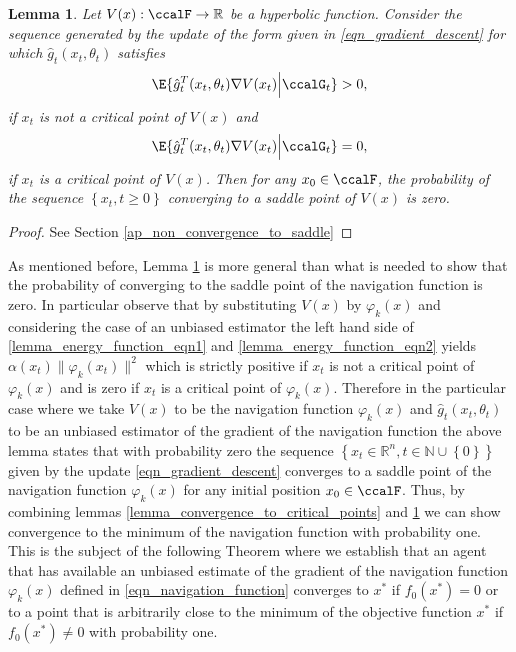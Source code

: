 \documentclass[article]{IEEEtran}
\newtheorem{lemma}{Lemma}
\theoremstyle{definition}
\begin{document}
%
\begin{lemma}\label{lemma_non_convergence_to_saddle}
Let $V(x): \ccalF \to \mathbb{R}$ be a hyperbolic function. Consider the sequence generated by the update of the form given in \eqref{eqn_gradient_descent} for which $\hat{g}_t(x_t,\theta_t)$ satisfies 
%
\begin{equation}\label{lemma_energy_function_eqn1}
\E{\hat{g}_t^T(x_t,\theta_t)\nabla V(x_t)\Big| \ccalG_t} > 0,
\end{equation}
%
if $x_t$ is not a critical point of $V(x)$ and
%
\begin{equation}\label{lemma_energy_function_eqn2}
\E{\hat{g}_t^T(x_t,\theta_t)\nabla V(x_t)\Big| \ccalG_t} = 0,
\end{equation}
%
if $x_t$ is a critical point of $V(x)$. Then for any $x_0 \in\ccalF$, the probability of the sequence $\left\{x_t, t\geq 0 \right\}$ converging to a saddle point of $V(x)$ is zero. 
\end{lemma}
\begin{proof}
See Section \ref{ap_non_convergence_to_saddle}
\end{proof}
%
%
As mentioned before, Lemma \ref{lemma_non_convergence_to_saddle} is more general than what is needed to show that the probability of converging to the saddle point of the navigation function is zero. In particular observe that by substituting $V(x)$ by $\varphi_k(x)$ and considering the case of an unbiased estimator the left hand side of \eqref{lemma_energy_function_eqn1} and \eqref{lemma_energy_function_eqn2} yields $\alpha(x_t)\|\varphi_k(x_t)\|^2$ which is strictly positive if $x_t$ is not a critical point of $\varphi_k(x)$ and is zero if $x_t$ is a critical point of $\varphi_k(x)$. Therefore in the particular case where we take $V(x)$ to be the navigation function $\varphi_k(x)$ and $\hat{g}_t(x_t,\theta_t)$ to be an unbiased estimator of the gradient of the navigation function the above lemma states that with probability zero the sequence $\left\{x_t \in \mathbb{R}^n, t \in \mathbb{N}\cup \left\{0\right\}\right\}$ given by the update \eqref{eqn_gradient_descent} converges to a saddle point of the navigation function $\varphi_k(x)$ for any initial position $x_0\in\ccalF$. Thus, by combining lemmas \ref{lemma_convergence_to_critical_points} and \ref{lemma_non_convergence_to_saddle} we can show convergence to the minimum of the navigation function with probability one. This is the subject of the following Theorem where we establish that an agent that has available an unbiased estimate of the gradient of the navigation function $\varphi_k(x)$ defined in \eqref{eqn_navigation_function} converges to $x^*$ if $f_0(x^*)=0$ or to a point that is arbitrarily close to the minimum of the objective function $x^*$ if $f_0(x^*)\neq 0$ with probability one. 
\end{document}
